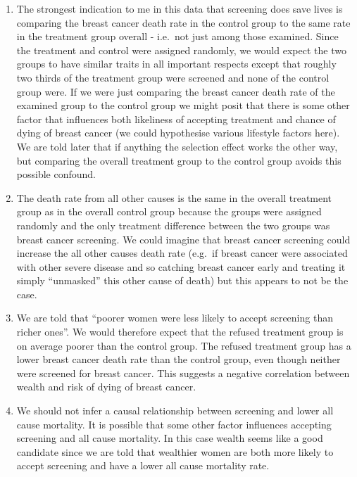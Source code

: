 \documentclass[
]{book}
\begin{document}
\begin{enumerate}
\def\labelenumi{\alph{enumi}.}
\item
  The strongest indication to me in this data that screening does save lives is comparing the breast cancer death rate in the control group to the same rate in the treatment group overall - i.e.~not just among those examined. Since the treatment and control were assigned randomly, we would expect the two groups to have similar traits in all important respects except that roughly two thirds of the treatment group were screened and none of the control group were.
  If we were just comparing the breast cancer death rate of the examined group to the control group we might posit that there is some other factor that influences both likeliness of accepting treatment and chance of dying of breast cancer (we could hypothesise various lifestyle factors here). We are told later that if anything the selection effect works the other way, but comparing the overall treatment group to the control group avoids this possible confound.
\item
  The death rate from all other causes is the same in the overall treatment group as in the overall control group because the groups were assigned randomly and the only treatment difference between the two groups was breast cancer screening. We could imagine that breast cancer screening could increase the all other causes death rate (e.g.~if breast cancer were associated with other severe disease and so catching breast cancer early and treating it simply ``unmasked'' this other cause of death) but this appears to not be the case.
\item
  We are told that ``poorer women were less likely to accept screening than richer ones''. We would therefore expect that the refused treatment group is on average poorer than the control group. The refused treatment group has a lower breast cancer death rate than the control group, even though neither were screened for breast cancer. This suggests a negative correlation between wealth and risk of dying of breast cancer.
\item
  We should not infer a causal relationship between screening and lower all cause mortality. It is possible that some other factor influences accepting screening and all cause mortality. In this case wealth seems like a good candidate since we are told that wealthier women are both more likely to accept screening and have a lower all cause mortality rate.
\end{enumerate}
\end{document}
